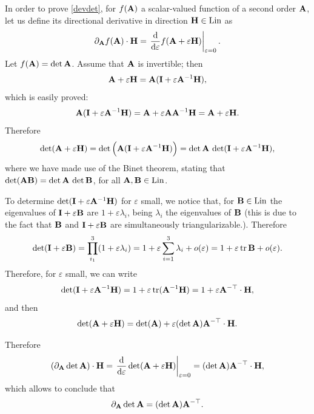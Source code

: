 \begin{remark}
In order to prove \eqref{devdet}, for $f(\mathbf{A})$ a scalar-valued function of a second order $\mathbf{A}$, let us define its directional derivative in direction $\mathbf{H}\in\operatorname{Lin}$ as
\begin{equation}
\partial_{\mathbf{A}} f(\mathbf{A})\cdot \mathbf{H}=\left.\frac{\mathrm{d}}{\mathrm{d} \varepsilon}f(\mathbf{A}+\varepsilon\mathbf{H})\right|_{\varepsilon=0}.
\end{equation}
Let $f(\mathbf{A})=\det\mathbf{A}$. Assume that $\mathbf{A}$ is invertible; then
\begin{equation}
	\mathbf{A}+\varepsilon\mathbf{H}=\mathbf{A}(\mathbf{I}+\varepsilon\mathbf{A}^{-1}\mathbf{H}),
\end{equation}
which is easily proved:
\begin{equation}
\mathbf{A}(\mathbf{I}+\varepsilon\mathbf{A}^{-1}\mathbf{H})=\mathbf{A}+\varepsilon\mathbf{A}\mathbf{A}^{-1}\mathbf{H}=\mathbf{A}+\varepsilon\mathbf{H}.
\end{equation}
Therefore
\begin{equation}
	\det(\mathbf{A}+\varepsilon\mathbf{H})=\det \Big(\mathbf{A}(\mathbf{I}+\varepsilon\mathbf{A}^{-1}\mathbf{H})  \Big)=\det\mathbf{A} \, \det(\mathbf{I}+\varepsilon\mathbf{A}^{-1}\mathbf{H}),
\end{equation}
where we have made use of the Binet theorem, stating that $\det(\mathbf{A}\mathbf{B})=\det\mathbf{A}\,\det\mathbf{B}$, for all $\mathbf{A},\mathbf{B}\in\operatorname{Lin}$.

To determine $\det(\mathbf{I}+\varepsilon\mathbf{A}^{-1}\mathbf{H})$ for $\varepsilon$ small, we notice that, for $\mathbf{B} \in\operatorname{Lin}$ the eigenvalues of $\mathbf{I}+\varepsilon\mathbf{B}$ are $1+\varepsilon\lambda_i$, being $\lambda_i$ the eigenvalues of $\mathbf{B}$ (this is due to the fact that $\mathbf{B}$ and $\mathbf{I}+\varepsilon\mathbf{B}$ are simultaneously triangularizable.). Therefore
\begin{equation}
	\det(\mathbf{I}+\varepsilon\mathbf{B})=\prod_{i_1}^3(1+\varepsilon\lambda_i)=1+\varepsilon\sum_{i=1}^3\lambda_i+o(\varepsilon)=1+\varepsilon\operatorname{tr}\mathbf{B}+o(\varepsilon).
\end{equation}
Therefore, for $\varepsilon$ small, we can write
\begin{equation}
\det(\mathbf{I}+\varepsilon\mathbf{A}^{-1}\mathbf{H})=1+\varepsilon\operatorname{tr}(\mathbf{A}^{-1}\mathbf{H})=1+\varepsilon\mathbf{A}^{-\top}\cdot\mathbf{H},
\end{equation}
and then
\begin{equation}
		\det(\mathbf{A}+\varepsilon\mathbf{H})=\det(\mathbf{A})+\varepsilon(\det\mathbf{A})\mathbf{A}^{-\top}\cdot\mathbf{H}.
		\end{equation}

Therefore
\begin{equation}
(\partial_{\mathbf{A}} \det\mathbf{A})\cdot \mathbf{H}=\left.\frac{\mathrm{d}}{\mathrm{d} \varepsilon}\det(\mathbf{A}+\varepsilon\mathbf{H})\right|_{\varepsilon=0}=(\det\mathbf{A})\mathbf{A}^{-\top}\cdot\mathbf{H},
\end{equation}
which allows to conclude that 
\begin{equation}
	\partial_{\mathbf{A}} \det\mathbf{A}=(\det\mathbf{A})\mathbf{A}^{-\top}.
\end{equation}

\end{remark}


